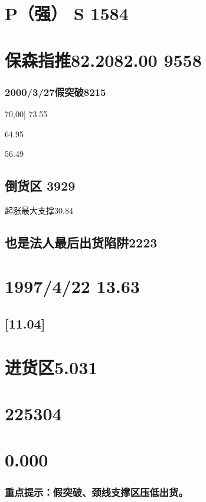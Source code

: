 \documentclass{article}
\begin{document}
\section{P（强） S 1584}

\section{保森指推82.2082.00 9558}

\subsubsection{2000/3/27假突破8215}

70,00] 73.55

64.95

56.49

\subsection{倒货区 3929}

起涨最大支撑30.84

\subsection{也是法人最后出货陷阱2223}

\section{1997/4/22 13.63}

\subsection{[11.04]}

\section{进货区5.031}

\section{225304}

\section{0.000}

\subsubsection{重点提示：假突破、颈线支撑区压低出货。}
\end{document}
